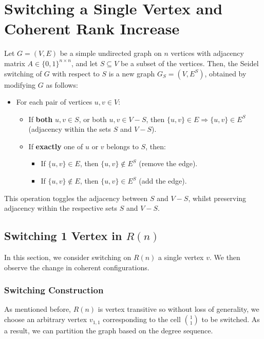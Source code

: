 \section{Switching a Single Vertex and Coherent Rank Increase}
\begin{definition}\label{def:seidel-switching}
    Let \( G = (V, E) \) be a simple undirected graph on \( n \) vertices with adjacency matrix \( A \in \{0,1\}^{n \times n} \), and let \( S \subseteq V \) be a subset of the vertices. Then, the Seidel switching of $G$ with respect to $S$ is a new graph $G_S = (V, E^S)$, obtained by modifying $G$ as follows:
    \begin{itemize}
        \item For each pair of vertices $u,v\in V$:
        \begin{itemize}
            \item If \textbf{both} $u,v\in S$, or both $u,v\in V-S$, then $\{u,v\}\in E \Rightarrow\{u,v\}\in E^S$ (adjacency within the sets $S$ and $V-S$).
            \item If \textbf{exactly} one of $u$ or $v$ belongs to $S$, then:
            \begin{itemize}
                \item If $\{u,v\}\in E$, then $\{u,v\}\notin E^S$ (remove the edge).
                \item If $\{u,v\}\notin E$, then $\{u,v\}\in E^S$ (add the edge).
            \end{itemize}
        \end{itemize}
    \end{itemize}
    This operation toggles the  adjacency between $S$ and $V-S$, whilst preserving adjacency within the respective sets $S$ and $V-S$.
\end{definition}


\subsection{Switching 1 Vertex in \texorpdfstring{$R(n)$}{R(n)}}
In this section, we consider switching on $R(n)$ a single vertex $v$. We then observe the change in coherent configurations.

\subsubsection{Switching Construction}
As mentioned before, $R(n)$ is vertex transitive so without loss of generality, we choose an arbitrary vertex $v_{1,1}$ corresponding to the cell $\binom{1}{1}$ to be switched. As a result, we can partition the graph based on the degree sequence.

